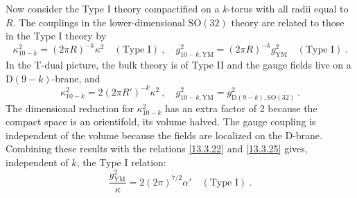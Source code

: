 Now consider the Type I theory compactified on a $k$-torus with all radii equal to $R$. The couplings in the lower-dimensional $\mathrm{SO}(32)$ theory are related to those in the Type I theory by
\begin{equation}
	\kappa_{10-k}^2 = (2\pi R)^{-k}\kappa^2 \quad (\text{Type I}) \:, \quad g_{10-k,\mathrm{YM}}^2 = (2\pi R)^{-k}g_{\mathrm{YM}}^2 \quad (\text{Type I}) \:. \label{13.3.29}
\end{equation}
In the T-dual picture, the bulk theory is of Type II and the gauge fields live on a D$(9-k)$-brane, and
\begin{equation}
	\kappa_{10-k}^2 = 2(2\pi R')^{-k}\kappa^2 \:, \quad g_{10-k,\mathrm{YM}}^2 = g_{\mathrm{D}(9-k),\mathrm{SO}(32)}^2 \:. \label{13.3.30}
\end{equation}
The dimensional reduction for $\kappa_{10-k}^2$ has an extra factor of 2 because the compact space is an orientifold, its volume halved. The gauge coupling is independent of the volume because the fields are localized on the D-brane. Combining these results with the relations \eqref{13.3.22} and \eqref{13.3.25} gives, independent of $k$, the Type I relation:
\begin{equation}
	\frac{g_{\mathrm{YM}}^2}{\kappa} = 2(2\pi)^{7/2}\alpha' \quad (\text{Type I}) \:. \label{13.3.31}
\end{equation}
